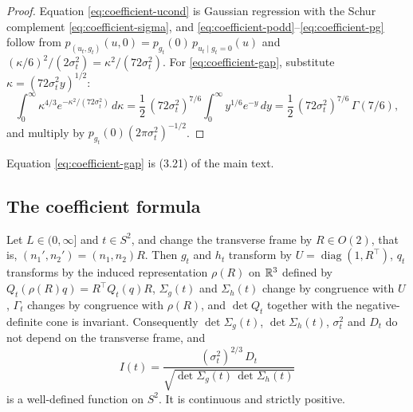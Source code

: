 \begin{proof}
Equation \eqref{eq:coefficient-ucond} is Gaussian regression with the Schur complement \eqref{eq:coefficient-sigma}, and \eqref{eq:coefficient-podd}--\eqref{eq:coefficient-pg} follow from $p_{(u_t,g_t)}(u,0)=p_{g_t}(0)\,p_{u_t\mid g_t=0}(u)$ and $(\kappa/6)^2/(2\sigma_t^2)=\kappa^2/(72\sigma_t^2)$. For \eqref{eq:coefficient-gap}, substitute $\kappa=(72\sigma_t^2y)^{1/2}$:
\[
\int_0^\infty\kappa^{4/3}e^{-\kappa^2/(72\sigma_t^2)}\,d\kappa=\frac12\,(72\sigma_t^2)^{7/6}\int_0^\infty y^{1/6}e^{-y}\,dy=\frac12\,(72\sigma_t^2)^{7/6}\,\Gamma(7/6),
\]
and multiply by $p_{g_t}(0)(2\pi\sigma_t^2)^{-1/2}$.
\end{proof}

Equation \eqref{eq:coefficient-gap} is (3.21) of the main text.

\subsection{The coefficient formula}\label{ssec:coefficient-main}

\begin{lemma}\label{lem:coefficient-frame}
Let $L\in(0,\infty]$ and $t\in S^2$, and change the transverse frame by $R\in O(2)$, that is, $(n_1',n_2')=(n_1,n_2)R$. Then $g_t$ and $h_t$ transform by $U=\operatorname{diag}(1,R^{\top})$, $q_t$ transforms by the induced representation $\rho(R)$ on $\mathbb R^3$ defined by $Q_t(\rho(R)q)=R^{\top}Q_t(q)R$, $\Sigma_g(t)$ and $\Sigma_h(t)$ change by congruence with $U$, $\Gamma_t$ changes by congruence with $\rho(R)$, and $\det Q_t$ together with the negative-definite cone is invariant. Consequently $\det\Sigma_g(t)$, $\det\Sigma_h(t)$, $\sigma_t^2$ and $D_t$ do not depend on the transverse frame, and
\begin{equation}\label{eq:coefficient-I}
I(t)=\frac{(\sigma_t^2)^{2/3}\,D_t}{\sqrt{\det\Sigma_g(t)\,\det\Sigma_h(t)}}
\end{equation}
is a well-defined function on $S^2$. It is continuous and strictly positive.
\end{lemma}

